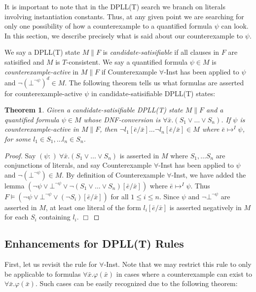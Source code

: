 \documentclass{llncs}
\newtheorem{thm}{Theorem}
\begin{document}
It is important to note that in the DPLL(T) search we branch on literals involving instantiation constants.
Thus, at any given point we are searching for only one possibility of how a counterexample to a quantified formula $\psi$ can look.
In this section, we describe precisely what is said about our counterexample to $\psi$.

We say a DPLL(T) state $M \parallel F$ is \emph{candidate-satisifiable} if all clauses in $F$ are satisified and $M$ is $T$-consistent.
We say a quantified formula $\psi \in M$ is \emph{counterexample-active} in $M \parallel F$ if Counterexample $\forall$-Inst has been applied to $\psi$ and $\neg (\bot^{\neg \psi})^d \in M$.
The following theorem tells us what formulas are asserted for counterexample-active $\psi$ in candidate-satisifiable DPLL(T) states:

\begin{thm}
\label{thm:cerep}
Given a candidate-satisifiable DPLL(T) state $M \parallel F$ and a quantified formula $\psi \in M$ whose DNF-conversion is $\forall \bar{x}. (S_1 \vee \ldots \vee S_n)$.
If $\psi$ is counterexample-active in $M \parallel F$, then $\neg l_1 [\bar{e}/\bar{x}] \ldots \neg l_n [\bar{e}/\bar{x}] \in M$ where $\bar{e} \mapsto^I \psi$, for some $l_1 \in S_1, \ldots l_n \in S_n$.
\end{thm}
\begin{proof}
Say $(\psi :) \ \forall \bar{x}. (S_1 \vee \ldots \vee S_n)$ is asserted in $M$ where $S_1, \ldots S_n$ are conjunctions of literals, and say Counterexample $\forall$-Inst has been applied to $\psi$ and $\neg (\bot^{\neg \psi}) \in M$.
By definition of Counterexample $\forall$-Inst, we have added the lemma $( \neg \psi \vee \bot^{\neg \psi} \vee \neg (S_1 \vee \ldots \vee S_n )[\bar{e}/\bar{x}] )$ where $\bar{e} \mapsto^I \psi$.
Thus $F \models ( \neg \psi \vee \bot^{\neg \psi} \vee (\neg S_i)[\bar{e}/\bar{x}])$ for all $1 \leq i \leq n$.
Since $\psi$ and $\neg \bot^{\neg \psi}$ are asserted in $M$, at least one literal of the form $l_i[\bar{e}/\bar{x}]$ is asserted negatively in $M$ for each $S_i$ containing $l_i$. $\Box$
\end{proof}

\subsection{Enhancements for DPLL(T) Rules}

First, let us revisit the rule for $\forall$-Inst.
Note that we may restrict this rule to only be applicable to formulas $\forall \bar{x}. \varphi( \bar{ x } )$ in cases where a counterexample can exist to $\forall \bar{x}. \varphi( \bar{ x } )$.
Such cases can be easily recognized due to the following theorem:
\end{document}
